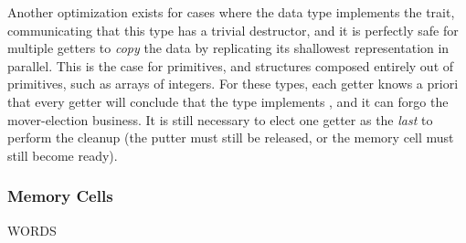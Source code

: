 Another optimization exists for cases where the data type implements the  trait, communicating that this type has a trivial destructor, and it is perfectly safe for multiple getters to \textit{copy} the data by replicating its shallowest representation in parallel. This is the case for primitives, and structures composed entirely out of primitives, such as arrays of integers. For these types, each getter knows a priori that every getter will conclude that the type implements , and it can forgo the mover-election business. It is still necessary to elect one getter as the \textit{last} to perform the cleanup (the putter must still be released, or the memory cell must still become ready).



\subsubsection{Memory Cells}
\label{sec:memory_cells}
WORDS



